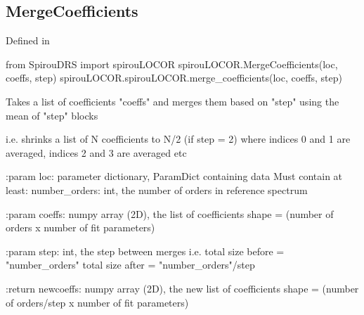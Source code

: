 \noindent\begin{minipage}{\textwidth}
\subsection{MergeCoefficients}

Defined in \spirouLOCOR{}

\begin{pythonbox}
from SpirouDRS import spirouLOCOR
spirouLOCOR.MergeCoefficients(loc, coeffs, step)
spirouLOCOR.spirouLOCOR.merge_coefficients(loc, coeffs, step)
\end{pythonbox}

\begin{pythondocstring}
Takes a list of coefficients "coeffs" and merges them based on "step"
using the mean of "step" blocks

i.e. shrinks a list of N coefficients to N/2 (if step = 2) where
     indices 0 and 1 are averaged, indices 2 and 3 are averaged etc

:param loc: parameter dictionary, ParamDict containing data
        Must contain at least:
            number_orders: int, the number of orders in reference spectrum

:param coeffs: numpy array (2D), the list of coefficients
               shape = (number of orders x number of fit parameters)

:param step: int, the step between merges
             i.e. total size before = "number_orders"
                  total size after = "number_orders"/step

:return newcoeffs: numpy array (2D), the new list of coefficients
            shape = (number of orders/step x number of fit parameters)
\end{pythondocstring}
\end{minipage}

